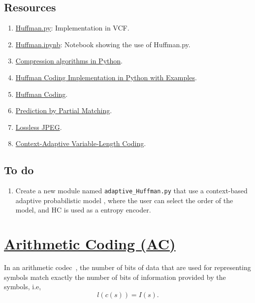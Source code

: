 \subsection*{Resources}
\begin{enumerate}
\item \href{https://github.com/Sistemas-Multimedia/VCF/blob/main/src/Huffman.py}{Huffman.py}: Implementation in VCF.
\item \href{https://github.com/Sistemas-Multimedia/VCF/blob/main/notebooks/Huffman.ipynb}{Huffman.ipynb}: Notebook showing the use of Huffman.py.
\item \href{https://www.inference.org.uk/mackay/python/compress/#Huff}{Compression algorithms in Python}.
\item \href{https://favtutor.com/blogs/huffman-coding}{Huffman Coding Implementation in Python with Examples}.
\item \href{https://www.programiz.com/dsa/huffman-coding}{Huffman Coding}.
\item \href{https://en.wikipedia.org/wiki/Prediction_by_partial_matching}{Prediction by Partial Matching}.
\item \href{https://en.wikipedia.org/wiki/Lossless_JPEG}{Lossless JPEG}.
\item \href{https://en.wikipedia.org/wiki/Context-adaptive_variable-length_coding}{Context-Adaptive Variable-Length Coding}.
\end{enumerate}

\subsection*{To do}
\begin{enumerate}
\item Create a new module named \texttt{adaptive\_Huffman.py} that use
  a context-based adaptive probabilistic model
  \cite{nelson96datacompression}, where the user can select the order
  of the model, and HC is used as a entropy encoder.
\end{enumerate}

\section{\href{https://en.wikipedia.org/wiki/Arithmetic_coding}{Arithmetic
    Coding (AC)}}

In an arithmetic codec~\cite{vruiz__arithmetic_coding,ruiz2000compresion}, the number of
bits of data that are used for representing symbols match
exactly the number of bits of information provided by the symbols, i.e,
\begin{equation}
  l(c(s)) = I(s).
\end{equation}

